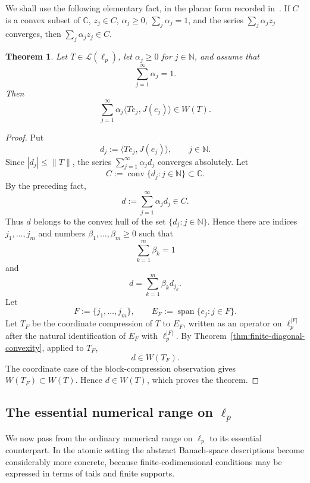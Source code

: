\documentclass[11pt]{amsart}
\numberwithin{equation}{section}
\newtheorem{theorem}{Theorem}[section]
\theoremstyle{definition}
\theoremstyle{remark}
\DeclareMathOperator{\conv}{conv}
\newcommand{\C}{\mathbb{C}}
\newcommand{\N}{\mathbb{N}}
\newcommand{\ip}[2]{\langle #1,#2\rangle}
\begin{document}
We shall use the following elementary fact, in the planar form recorded in~\cite{RubinWesler1958}. If $C$ is a convex subset of $\mathbb C$, $z_j\in C$, $\alpha_j\ge0$, $\sum_j\alpha_j=1$, and the series $\sum_j\alpha_j z_j$ converges, then $\sum_j\alpha_j z_j\in C$. %

\begin{theorem}\label{thm:countable-diagonal-convex}
Let $T\in \mathcal L(\ell_p)$, let $\alpha_j\ge 0$ for $j\in\N$, and assume that
\[
\sum_{j=1}^\infty \alpha_j=1.
\]
Then
\[
\sum_{j=1}^\infty \alpha_j\ip{Te_j}{J(e_j)}\in W(T).
\]
\end{theorem}

\begin{proof}
Put
\[
        d_j:=\ip{Te_j}{J(e_j)},\qquad j\in\N.
\]
Since $|d_j|\le \|T\|$, the series $\sum_{j=1}^\infty\alpha_jd_j$ converges absolutely. Let
\[
        C:=\conv\{d_j:j\in\N\}\subset\C.
\]
By the preceding fact,
\[
        d:=\sum_{j=1}^\infty\alpha_jd_j\in C.
\]
Thus $d$ belongs to the convex hull of the set $\{d_j:j\in\N\}$. Hence there are indices $j_1,\ldots,j_m$ and numbers $\beta_1,\ldots,\beta_m\ge0$ such that
\[
        \sum_{k=1}^m\beta_k=1
\]
and
\[
        d=\sum_{k=1}^m\beta_k d_{j_k}.
\]
Let
\[
        F:=\{j_1,\ldots,j_m\},
        \qquad E_F:=\operatorname{span}\{e_j:j\in F\}.
\]
Let $T_F$ be the coordinate compression of $T$ to $E_F$, written as an operator on $\ell_p^{|F|}$ after the natural identification of $E_F$ with $\ell_p^{|F|}$. By Theorem~\ref{thm:finite-diagonal-convexity}, applied to $T_F$,
\[
        d\in W(T_F).
\]
The coordinate case of the block-compression observation gives $W(T_F)\subset W(T)$. Hence $d\in W(T)$, which proves the theorem.
\end{proof}

\subsection{The essential numerical range on $\ell_p$}

We now pass from the ordinary numerical range on $\ell_p$ to its essential counterpart. In the atomic setting the abstract Banach-space descriptions become considerably more concrete, because finite-codimensional conditions may be expressed in terms of tails and finite supports.
\end{document}
